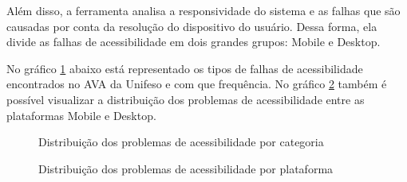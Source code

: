 \documentclass[
	12pt,				%
	openright,			%
	oneside,			%
	a4paper,			%
	chapter=TITLE,		%
	section=TITLE,		%
	subsection=TITLE,	%
	subsubsection=TITLE,%
	english,			%
	brazil				%
	]{abntex2}
\theoremstyle{definition}
\begin{document}
Além disso, a ferramenta analisa a responsividade do sistema e as falhas que são causadas por conta da resolução do dispositivo do usuário. Dessa forma, ela divide as falhas de acessibilidade em dois grandes grupos: Mobile e Desktop.

No gráfico \ref{Distribuição dos problemas de acessibilidade por categoria} abaixo está representado os tipos de falhas de acessibilidade encontrados no AVA da Unifeso e com que frequência. No gráfico \ref{Distribuição dos problemas de acessibilidade por plataforma} também é possível visualizar a distribuição dos problemas de acessibilidade entre as plataformas Mobile e Desktop.


\begin{figure}[!h]
\centering
\caption{Distribuição dos problemas de acessibilidade por categoria}
\label{Distribuição dos problemas de acessibilidade por categoria}
\end{figure}


\begin{figure}[!h]
\centering
\caption{Distribuição dos problemas de acessibilidade por plataforma}
\label{Distribuição dos problemas de acessibilidade por plataforma}
\end{figure}
\end{document}

